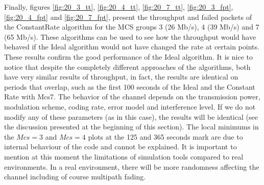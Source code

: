 \documentclass[12]{article}
\begin{document}
Finally, figures \ref{fig:20_3_tt}, \ref{fig:20_4_tt}, \ref{fig:20_7_tt}, \ref{fig:20_3_fpt}, \ref{fig:20_4_fpt} and \ref{fig:20_7_fpt}, present the throughput and failed packets of the ConstantRate algorithm for the MCS groups 3 (26 Mb/s), 4 (39 Mb/s) and 7 (65 Mb/s). These algorithms can be used to see how the throughput would have behaved if the Ideal algorithm would not have changed the rate at certain points. These results confirm the good performance of the Ideal algorithm. It is nice to notice that despite the completely different approaches of the algorithms, both have very similar results of throughput, in fact, the results are identical on periods that overlap, such as the first 100 seconds of the Ideal and the Constant Rate with Mcs7. The behavior of the channel depends on the transmission power, modulation scheme, coding rate, error model and interference level. If we do not modify any of these parameters (as in this case), the results will be identical (see the discussion presented at the beginning of this section). The local minimums in the $Mcs = 3$ and $Mcs = 4$ plots at the 125 and 365 seconds mark are due to internal behaviour of the code and cannot be explained. It is important to mention at this moment the limitations of simulation tools compared to real environments. In a real environment, there will be more randomness affecting the channel including of course multipath fading.
\end{document}

